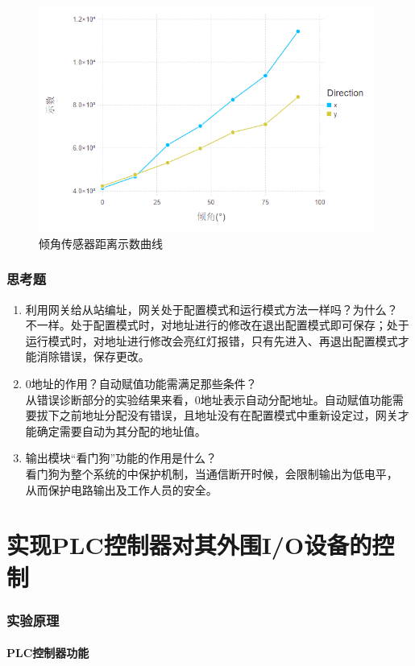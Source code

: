 \begin{figure}[htbp]
\centering
\includegraphics[width=11cm]{resource/dqr.png}
\caption{倾角传感器距离示数曲线}
\label{fig:dqr}
\end{figure}

\section{思考题}
\begin{enumerate}
\item 利用网关给从站编址，网关处于配置模式和运行模式方法一样吗？为什么？\\
不一样。处于配置模式时，对地址进行的修改在退出配置模式即可保存；处于运行模式时，对地址进行修改会亮红灯报错，只有先进入、再退出配置模式才能消除错误，保存更改。
\item 0地址的作用？自动赋值功能需满足那些条件？\\
从错误诊断部分的实验结果来看，0地址表示自动分配地址。自动赋值功能需要拔下之前地址分配没有错误，且地址没有在配置模式中重新设定过，网关才能确定需要自动为其分配的地址值。
\item 输出模块“看门狗”功能的作用是什么？\\
看门狗为整个系统的中保护机制，当通信断开时候，会限制输出为低电平， 从而保护电路输出及工作人员的安全。

\end{enumerate}
\part{实现PLC控制器对其外围I/O设备的控制}
\section{实验原理}
\subsection{PLC控制器功能}
\
